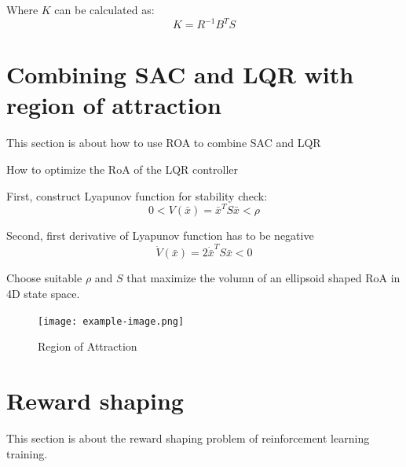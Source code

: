Where \(K\) can be calculated as:
\begin{equation}
    K = R^{-1}B^T S
\end{equation}

\section{Combining SAC and LQR with region of attraction}
This section is about how to use ROA to combine SAC and LQR

How to optimize the RoA of the LQR controller

First, construct Lyapunov function for stability check:
\begin{equation}
    0< V(\bar{x}) = \bar{x}^T S \bar{x} < \rho
\end{equation}

Second, first derivative of Lyapunov function has to be negative
\begin{equation}
    \dot{V}(\bar{x}) = 2\dot{\bar{x}}^T S \bar{x} < 0
\end{equation}

Choose suitable \(\rho\) and \(S\) that maximize the volumn of an ellipsoid shaped RoA in 4D state space.

\begin{figure}[htbp]
    \centering
    \texttt{[image: example-image.png]} %
    \caption{Region of Attraction}
    \label{fig:example}
\end{figure}

\section{Reward shaping}
This section is about the reward shaping problem of reinforcement learning training.

